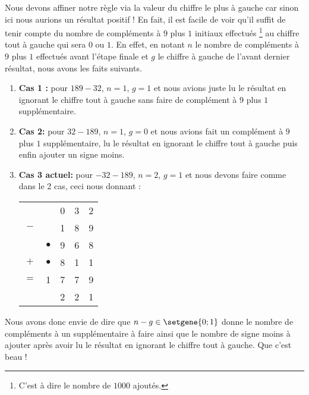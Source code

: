 Nous devons affiner notre règle via la valeur du chiffre le plus à gauche car sinon ici nous aurions un résultat positif !
En fait, il est facile de voir qu'il suffit de tenir compte du nombre de compléments à $9$ plus $1$ initiaux effectués
\footnote{
	C'est à dire le nombre de $1000$ ajoutés.
}
au chiffre tout à gauche qui sera $0$ ou $1$.
En effet, en notant $n$ le nombre de compléments à $9$ plus $1$ effectués avant l'étape finale et $g$ le chiffre à gauche de l'avant dernier résultat, nous avons les faits suivants.

\begin{enumerate}
	\item \textbf{Cas 1 :} pour $189 - 32$, $n = 1$, $g = 1$ et nous avions juste lu le résultat en ignorant le chiffre tout à gauche sans faire de complément à $9$ plus $1$ supplémentaire.


	\item \textbf{Cas 2:} pour $32 - 189$, $n = 1$, $g = 0$ et nous avions fait un complément à $9$ plus $1$ supplémentaire, lu le résultat en ignorant le chiffre tout à gauche puis enfin ajouter un signe moins.


	\item \textbf{Cas 3 actuel:} pour $-32 - 189$, $n = 2$, $g = 1$ et nous devons faire comme dans le 2\ieme{} cas, ceci nous donnant :

    \begin{center}
    \begin{tabular}{ccccc}
    	    & \sign{-}  & 0 & 3 & 2 \\
    	$-$ &           & 1 & 8 & 9 \\
    	\hline
    	\hline
    	    & $\bullet$ & 9 & 6 & 8 \\
    	$+$ & $\bullet$ & 8 & 1 & 1 \\
    	\hline
        $=$ & 1         & 7 & 7 & 9 \\
    	\hline
    	\hline
            & \sign{-}  & 2 & 2 & 1 \\
    \end{tabular}
    \end{center}
\end{enumerate}


Nous avons donc envie de dire que $n - g \in \setgene{0 ; 1}$ donne le nombre de compléments à un supplémentaire à faire ainsi que le nombre de signe moins à ajouter après avoir lu le résultat en ignorant le chiffre tout à gauche. Que c'est beau !

\smallskip

